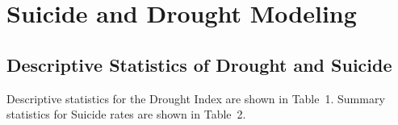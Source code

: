 \documentclass[a4paper]{article}                %
\begin{document}








\section{Suicide and Drought Modeling}







\subsection{Descriptive Statistics of Drought and Suicide}
Descriptive statistics for the Drought Index are shown in Table~1.  Summary statistics for Suicide rates are shown in Table~2.
\end{document}

